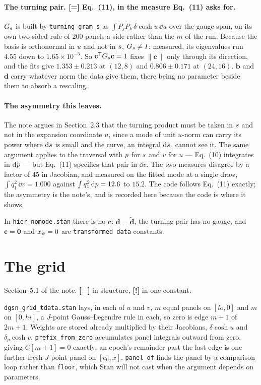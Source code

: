 \documentclass[11pt]{article}
\newcommand{\file}[1]{\texttt{#1}}
\newcommand{\code}[1]{\texttt{#1}}
\begin{document}
\paragraph{The turning pair. [=] Eq.~(11), in the measure Eq.~(11) asks for.} $G_{s}$ is
built by \code{turning\_gram\_s} as
$\int \tilde P_{j}\tilde P_{k}\,\delta\cosh u\,\dd u$ over the gauge span, on its own
two-sided rule of $200$ panels a side rather than the $m$ of the run. Because the basis is
orthonormal in $u$ and not in $s$, $G_{s} \neq I$: measured, its eigenvalues run
$4.55$ down to $1.65\times10^{-5}$. So $\mathbf{c}^{\mathsf T}G_{s}\mathbf{c} = 1$ fixes
$\lVert\mathbf{c}\rVert$ only through its direction, and the fits give $1.353 \pm 0.213$ at
$(12, 8)$ and $0.806 \pm 0.171$ at $(24, 16)$. $\mathbf{b}$ and $\mathbf{d}$ carry whatever
norm the data give them, there being no parameter beside them to absorb a rescaling.

\paragraph{The asymmetry this leaves.} The note argues in Section~2.3 that the turning
product must be taken in $s$ and not in the expansion coordinate $u$, since a mode of
unit $u$-norm can carry its power where $\mathrm{d}s$ is small and the curve, an integral
$\mathrm{d}s$, cannot see it. The same argument applies to the traversal with $p$ for
$s$ and $v$ for $u$ --- Eq.~(10) integrates in $\mathrm{d}p$ --- but Eq.~(11) specifies
that pair in $\dd v$. The two measures disagree by a factor of $45$ in Jacobian, and
measured on the fitted mode at a single draw, $\int q_{1}^{2}\,\dd v = 1.000$ against
$\int q_{1}^{2}\,\mathrm{d}p = 12.6$ to $15.2$. The code follows Eq.~(11) exactly; the
asymmetry is the note's, and is recorded here because the code is where it shows.

In \file{hier\_nomode.stan} there is no $\mathbf{c}$: $\mathbf{d} = \tilde{\mathbf{d}}$, the
turning pair has no gauge, and $\mathbf{c} = \mathbf{0}$ and $x_{\psi} = 0$ are
\code{transformed data} constants.

\section{The grid}

Section~5.1 of the note. \textbf{[=]} in structure, \textbf{[!]} in one constant.

\file{dgsn\_grid\_tdata.stan} lays, in each of $u$ and $v$, $m$ equal panels on $[lo, 0]$ and
$m$ on $[0, hi]$, a $J$-point Gauss--Legendre rule in each, so zero is edge $m+1$ of
$2m+1$. Weights are stored already multiplied by their Jacobians,
$\delta\cosh u$ and $\delta_{p}\cosh v$. \code{prefix\_from\_zero} accumulates panel
integrals outward from zero, giving $C[m+1] = 0$ exactly; an epoch's remainder past the last
edge is one further fresh $J$-point panel on $[e_{0}, x]$. \code{panel\_of} finds the panel
by a comparison loop rather than \code{floor}, which Stan will not cast when the argument
depends on parameters.
\end{document}
